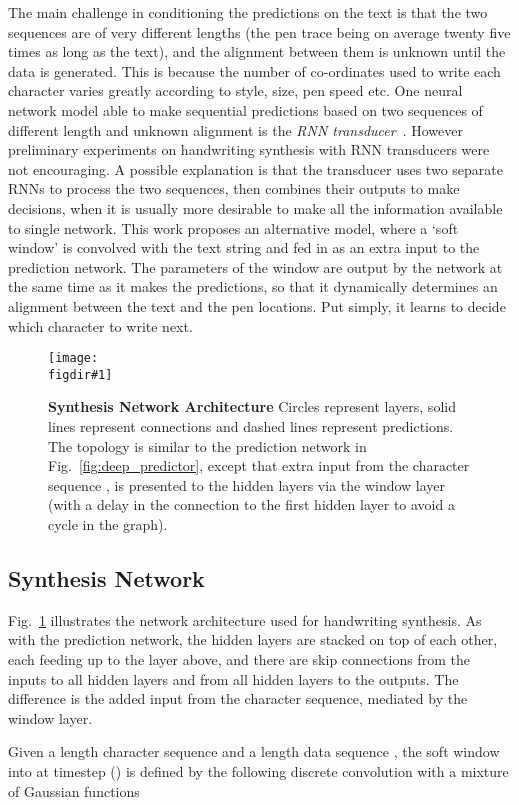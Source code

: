 \documentclass{article}
\newcommand{\flabel}[1]{\label{fig:#1}}
\newcommand{\fref}[1]{Fig.~\ref{fig:#1}}
\newcommand{\figdir}{}
\newcommand{\capt}[2]{\caption[#1]{\textbf{#1}#2}}
\newcommand{\fig}[5]
{
\begin{figure}
\begin{center}
\texttt{[image: \\figdir\#1]}
\end{center}
\capt{#4}{#5}
\flabel{#2}
\end{figure}
}
\begin{document}
The main challenge in conditioning the predictions on the text is that the two sequences are of very different lengths (the pen trace being on average twenty five times as long as the text), and the alignment between them is unknown until the data is generated.
This is because the number of co-ordinates used to write each character varies greatly according to style, size, pen speed etc.
One neural network model able to make sequential predictions based on two sequences of different length and unknown alignment is the \emph{RNN transducer}~\cite{graves12transducer}.
However preliminary experiments on handwriting synthesis with RNN transducers were not encouraging.
A possible explanation is that the transducer uses two separate RNNs to process the two sequences, then combines their outputs to make decisions, when it is usually more desirable to make all the information available to single network.
This work proposes an alternative model, where a `soft window' is convolved with the text string and fed in as an extra input to the prediction network.
The parameters of the window are output by the network at the same time as it makes the predictions, so that it dynamically determines an alignment between the text and the pen locations.
Put simply, it learns to decide which character to write next.

\fig{synth_net_two_layers}{synth_net}{1}{Synthesis Network Architecture}{ Circles represent layers, solid lines represent connections and dashed lines represent predictions. The topology is similar to the prediction network in \fref{deep_predictor}, except that extra input from the character sequence , is presented to the hidden layers via the window layer (with a delay in the connection to the first hidden layer to avoid a cycle in the graph).}

\subsection{Synthesis Network}

\fref{synth_net} illustrates the network architecture used for handwriting synthesis.
As with the prediction network, the hidden layers are stacked on top of each other, each feeding up to the layer above, and there are skip connections from the inputs to all hidden layers and from all hidden layers to the outputs. 
The difference is the added input from the character sequence, mediated by the window layer.

Given a length  character sequence  and a length  data sequence , the soft window  into  at timestep  () is defined by the following discrete convolution with a mixture of  Gaussian functions
\end{document}
